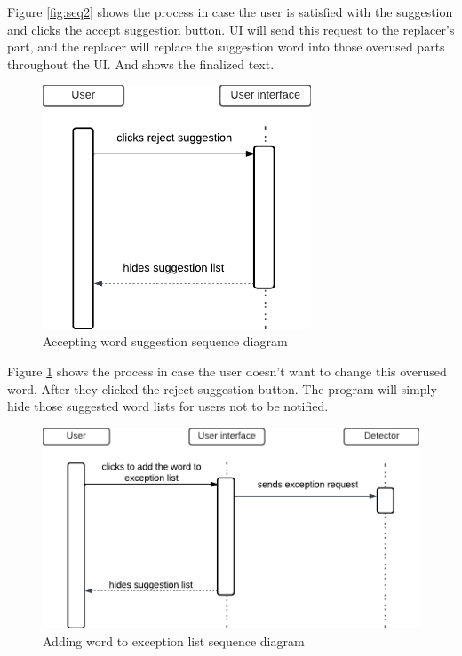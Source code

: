 \documentclass[12pt,oneside,openright,a4paper]{cpe-english-project}
\begin{document}
Figure \ref{fig:seq2} shows the process in case the user is satisfied with the suggestion and clicks the accept suggestion button. UI will send this request to the replacer's part, and the replacer will replace the suggestion word into those overused parts throughout the UI. And shows the finalized text.\\

\begin{figure}[!h]\centering
\includegraphics[width=8cm]{./img/chp3/Sequence3.png}
\caption{Accepting word suggestion sequence diagram}\label{fig:seq3}
\end{figure}

Figure \ref{fig:seq3} shows the process in case the user doesn’t want to change this overused word. After they clicked the reject suggestion button. The program will simply hide those suggested word lists for users not to be notified.

\begin{figure}[!h]\centering
\includegraphics[width=15cm]{./img/chp3/Sequence4.png}
\caption{Adding word to exception list sequence diagram}\label{fig:seq4}
\end{figure}
\end{document}
